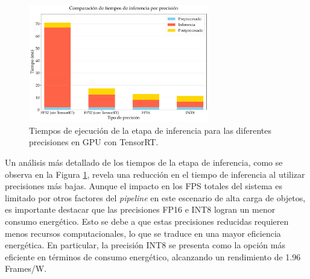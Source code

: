 \documentclass[11pt,spanish,listoffigures,listoftables]{tfgetsinf}
\begin{document}
\begin{figure}[H]
   \centering
   \includegraphics[width=0.7\textwidth]{excels/inferencia/precision_device/tiempos_inferencia_device/tiempos_inferencia_device.pdf}
   \caption[Tiempos de ejecución de la etapa de inferencia para las diferentes precisiones en GPU con TensorRT]{Tiempos de ejecución de la etapa de inferencia para las diferentes precisiones en GPU con TensorRT.}
   \label{fig:tiempos_inferencia_gpu}
\end{figure}
Un análisis más detallado de los tiempos de la etapa de inferencia, como se observa en la Figura \ref{fig:tiempos_inferencia_gpu}, revela una reducción en el tiempo de inferencia al utilizar precisiones más bajas. Aunque el impacto en los FPS totales del sistema es limitado por otros factores del \textit{pipeline} en este escenario de alta carga de objetos, es importante destacar que las precisiones FP16 e INT8 logran un menor consumo energético. Esto se debe a que estas precisiones reducidas requieren menos recursos computacionales, lo que se traduce en una mayor eficiencia energética. En particular, la precisión INT8 se presenta como la opción más eficiente en términos de consumo energético, alcanzando un rendimiento de 1.96 Frames/W.
\end{document}
